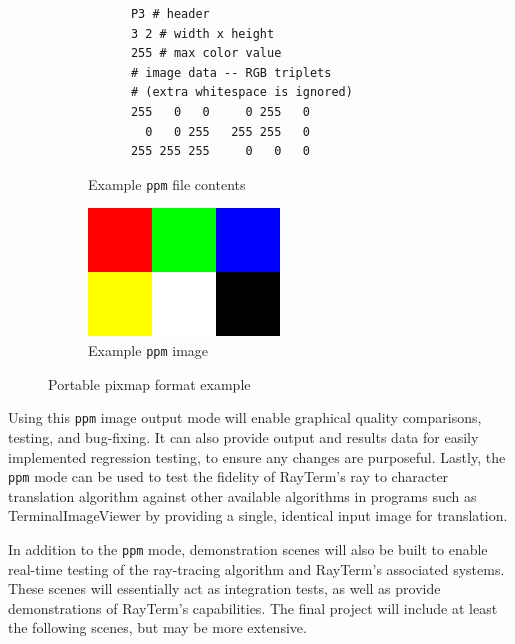 \documentclass[11pt]{article}
\newcommand{\name}{{\sc RayTerm}}
\begin{document}
\begin{figure}[htb]
  \begin{subfigure}[htb]{0.5\textwidth}
    \small
    \begin{verbatim}
      P3 # header
      3 2 # width x height
      255 # max color value
      # image data -- RGB triplets
      # (extra whitespace is ignored)
      255   0   0     0 255   0
        0   0 255   255 255   0
      255 255 255     0   0   0
    \end{verbatim}
    \caption{Example \texttt{ppm} file contents}
    \label{fig:ppm_code}
  \end{subfigure}
  \begin{subfigure}[htb]{0.5\textwidth}
    \includegraphics[width=\textwidth]{resources/ppm_example}
    \caption{Example \texttt{ppm} image}
    \label{fig:ppm_image}
  \end{subfigure}
  \caption{Portable pixmap format example}
\end{figure}

Using this \texttt{ppm} image output mode will enable graphical quality comparisons, testing, and bug-fixing.
It can also provide output and results data for easily implemented regression testing, to ensure any changes are purposeful.
Lastly, the \texttt{ppm} mode can be used to test the fidelity of \name's ray to character translation algorithm against other available algorithms in programs such as TerminalImageViewer by providing a single, identical input image for translation.

In addition to the \texttt{ppm} mode, demonstration scenes will also be built to enable real-time testing of the ray-tracing algorithm and \name's associated systems.
These scenes will essentially act as integration tests, as well as provide demonstrations of \name's capabilities.
The final project will include at least the following scenes, but may be more extensive.
\end{document}
